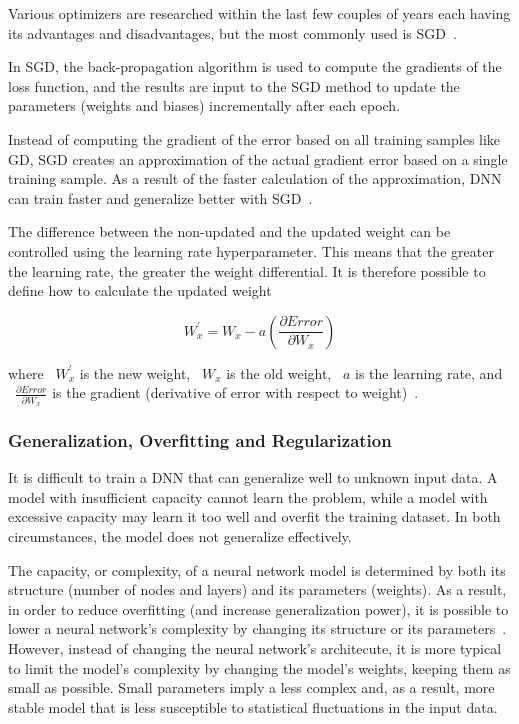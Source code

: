 Various optimizers are researched within the last few couples of years each having its advantages and disadvantages, but the most commonly used is \gls{SGD}~\cite{Chauhan2020OptimizationNetworks}.

In \gls{SGD}, the back-propagation algorithm is used to compute the gradients of the loss function, and the results are input to the \gls{SGD} method to update the parameters (weights and biases) incrementally after each epoch.

Instead of computing the gradient of the error based on all training samples like GD, \gls{SGD} creates an approximation of the actual gradient error based on a single training sample. As a result of the faster calculation of the approximation, \gls{DNN} can train faster and generalize better with \gls{SGD}~\cite{Amir2021SGDHelp}.

The difference between the non-updated and the updated weight can be controlled using the learning rate hyperparameter. This means that the greater the learning rate, the greater the weight differential. It is therefore possible to define how to calculate the updated weight

\begin{equation}\label{eq:4}
    W_{x}^{'} = W_{x} - a(\frac{\partial Error}{\partial W_{x}})
\end{equation}

where ~$W_{x}^{'}$ is the new weight, ~$W_{x}$ is the old weight, ~$a$ is the learning rate, and ~$\frac{\partial Error}{\partial W_{x}}$ is the gradient (derivative of error with respect to weight)~\cite{2019BackpropagationStep}.

\subsubsection{Generalization, Overfitting and Regularization}

It is difficult to train a \gls{DNN} that can generalize well to unknown input data. A model with insufficient capacity cannot learn the problem, while a model with excessive capacity may learn it too well and overfit the training dataset. In both circumstances, the model does not generalize effectively. 

The capacity, or complexity, of a neural network model is determined by both its structure (number of nodes and layers) and its parameters (weights). As a result, in order to reduce overfitting (and increase generalization power), it is possible to lower a neural network's complexity by changing its structure or its parameters~\cite{Brownlee2019HowNetworks}. However, instead of changing the neural network's architecute, it is more typical to limit the model's complexity by changing the model's weights, keeping them as small as possible. Small parameters imply a less complex and, as a result, more stable model that is less susceptible to statistical fluctuations in the input data.

